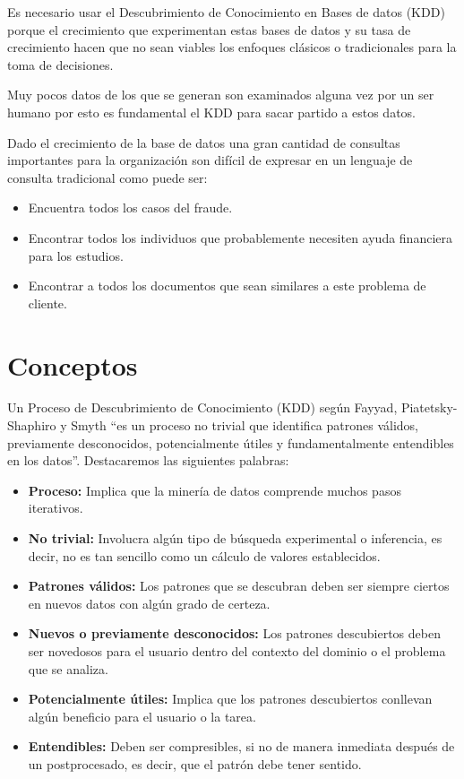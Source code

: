 \documentclass[12pt, twoside, openright]{report} %
\begin{document}
Es necesario usar el Descubrimiento de Conocimiento en Bases de datos (KDD) porque el crecimiento que experimentan estas bases de datos y su tasa de crecimiento hacen que no sean viables los enfoques clásicos o tradicionales para la toma de decisiones.

Muy pocos datos de los que se generan son examinados alguna vez por un ser humano por esto es fundamental el KDD para sacar partido a estos datos.

Dado el crecimiento de la base de datos una gran cantidad de consultas importantes para la organización son difícil de expresar en un lenguaje de consulta tradicional como puede ser:
\begin{itemize}
	\item Encuentra todos los casos del fraude.
	\item Encontrar todos los individuos que probablemente necesiten ayuda financiera para los estudios.
	\item Encontrar a todos los documentos que sean similares a este problema de cliente.
\end{itemize}

\section{Conceptos}
Un Proceso de Descubrimiento de Conocimiento (KDD) según Fayyad, Piatetsky-Shaphiro y Smyth “es un proceso no trivial que identifica patrones válidos, previamente desconocidos, potencialmente útiles y fundamentalmente entendibles en los datos”. Destacaremos las siguientes palabras:
\begin{itemize}
	\item \textbf{Proceso:} Implica que la minería de datos comprende muchos pasos iterativos.
	\item \textbf{No trivial:} Involucra algún tipo de búsqueda experimental o inferencia, es decir, no es tan sencillo como un cálculo de valores establecidos.
	\item \textbf{Patrones válidos:} Los patrones que se descubran deben ser siempre ciertos en nuevos datos con algún grado de certeza.
	\item \textbf{Nuevos o previamente desconocidos:} Los patrones descubiertos deben ser novedosos para el usuario dentro del contexto del dominio o el problema que se analiza.
	\item \textbf{Potencialmente útiles:} Implica que los patrones descubiertos conllevan algún beneficio para el usuario o la tarea.
	\item \textbf{Entendibles:} Deben ser compresibles, si no de manera inmediata después de un postprocesado, es decir, que el patrón debe tener sentido.
\end{itemize}
\end{document}
